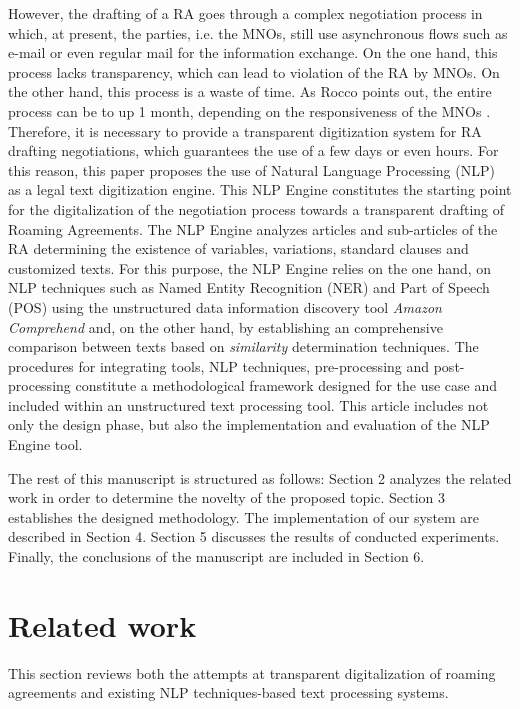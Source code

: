 \documentclass[conference]{style/IEEEtran}
\begin{document}
However, the drafting of a RA goes through a complex negotiation process in which, at present, the parties, i.e. the MNOs, still use asynchronous flows such as e-mail or even regular mail for the information exchange. On the one hand, this process lacks transparency, which can lead to violation of the RA by MNOs. On the other hand, this process is a waste of time. As Rocco points out, the entire process can be to up 1 month, depending on the responsiveness of the MNOs \cite{ROCCO2017a}. Therefore, it is necessary to provide a transparent digitization system for RA drafting negotiations, which guarantees the use of a few days or even hours. For this reason, this paper proposes the use of Natural Language Processing (NLP) as a legal text digitization engine. This NLP Engine constitutes the starting point for the digitalization of the negotiation process towards a transparent drafting of Roaming Agreements. The NLP Engine analyzes articles and sub-articles of the RA determining the existence of variables, variations, standard clauses and customized texts. For this purpose, the NLP Engine relies on the one hand, on NLP techniques such as Named Entity Recognition (NER) and Part of Speech (POS) using the unstructured data information discovery tool \textit{Amazon Comprehend} and, on the other hand, by establishing an comprehensive comparison between texts based on \textit{similarity} determination techniques. The procedures for integrating tools, NLP techniques, pre-processing and post-processing constitute a methodological framework designed for the use case and included within an unstructured text processing tool. This article includes not only the design phase, but also the implementation and evaluation of the NLP Engine tool.

The rest of this manuscript is structured as follows: Section 2 analyzes the related work in order to determine the novelty of the proposed topic. Section 3 establishes the designed methodology. The implementation of our system are described in Section 4. Section 5 discusses the results of conducted experiments. Finally, the conclusions of the manuscript are included in Section 6.

\section{Related work}

This section reviews both the attempts at transparent digitalization of roaming agreements and existing NLP techniques-based text processing systems.
\end{document}
